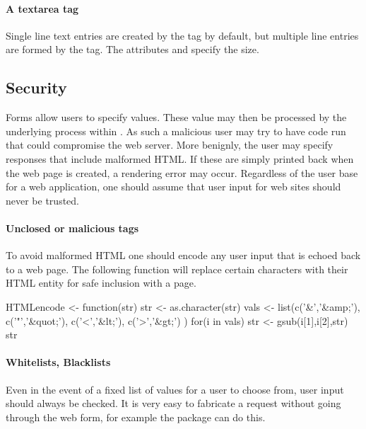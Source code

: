 \paragraph{A textarea tag}
Single line text entries are created by the  tag by
default, but multiple line entries are formed by the 
tag. The attributes  and
 specify the size.



\subsection{Security}

Forms allow users to specify values. These value may then be processed
by the underlying \R\/ process within . As such a
malicious user may try to have code run that could compromise the web
server. More benignly, the user may specify responses that include
malformed HTML. If these are simply printed back when the web page is
created, a rendering error may occur. Regardless of the user base for
a web application, one should assume that user input for web sites should never be trusted.

\paragraph{Unclosed or malicious tags}
To avoid malformed HTML one should encode any user input that is
echoed back to a web page. The following function will replace certain
characters with their HTML entity for safe inclusion with a page.

\begin{Schunk}
\begin{Sinput}
 HTMLencode <- function(str) {
   str <- as.character(str)
   vals <- list(c('&','&amp;'),
                c('"','&quot;'),
                c('<','&lt;'),
                c('>','&gt;')
                )
   for(i in vals)
     str <- gsub(i[1],i[2],str)
   str
 }
\end{Sinput}
\end{Schunk}

\paragraph{Whitelists, Blacklists}
Even in the event of a fixed list of values for a user to choose from,
user input should always be checked. It is very easy to fabricate a
request without going through the web form, for example the \R\/ package
 can do this.

